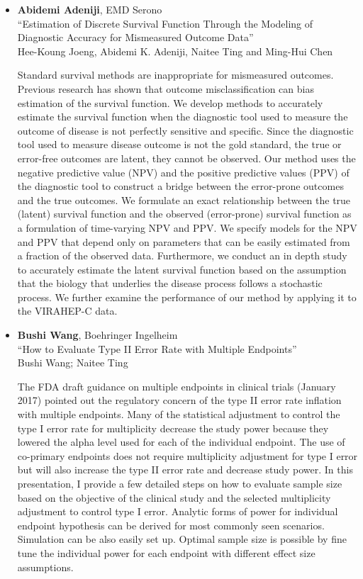 \begin{itemize}
\item \textbf{Abidemi Adeniji}, EMD Serono \\
``Estimation of Discrete Survival Function Through the Modeling of Diagnostic Accuracy for Mismeasured Outcome Data'' \\
Hee-Koung Joeng, Abidemi K. Adeniji, Naitee Ting and Ming-Hui Chen


Standard survival methods are inappropriate for mismeasured outcomes. Previous research has shown that outcome misclassification can bias estimation of the survival function. We develop methods to accurately estimate the survival function when the diagnostic tool used to measure the outcome of disease is not perfectly sensitive and specific. Since the diagnostic tool used to measure disease outcome is not the gold standard, the true or error-free outcomes are latent, they cannot be observed. Our method uses the negative predictive value (NPV) and the positive predictive values (PPV) of the diagnostic tool to construct a bridge between the error-prone outcomes and the true
outcomes. We formulate an exact relationship between the true (latent) survival function and the observed (error-prone) survival function as a formulation of time-varying NPV and PPV. We specify models for the NPV and PPV that depend only on parameters that can be easily estimated from a fraction of the observed data. Furthermore, we conduct an in depth study to accurately estimate the latent survival function based on the assumption that the biology that underlies the disease process follows a stochastic process. We further examine the performance of our method by applying it to the VIRAHEP-C data.

\item \textbf{Bushi Wang}, Boehringer Ingelheim \\
``How to Evaluate Type II Error Rate with Multiple Endpoints'' \\
Bushi Wang; Naitee Ting


The FDA draft guidance on multiple endpoints in clinical trials (January 2017) pointed out the regulatory concern of the type II error rate inflation with multiple endpoints. Many of the statistical adjustment to control the type I error rate for multiplicity decrease the study power because they lowered the alpha level used for each of the individual endpoint. The use of co-primary endpoints does not require multiplicity adjustment for type I error but will also increase the type II error rate and decrease study power. In this presentation, I provide a few detailed steps on how to evaluate sample size based on the objective of the clinical study and the selected multiplicity adjustment to control type I error. Analytic forms of power for individual endpoint hypothesis can be derived for most commonly seen scenarios. Simulation can be also easily set up. Optimal sample size is possible by fine tune the individual power for each endpoint with different effect size assumptions.


\end{itemize}
